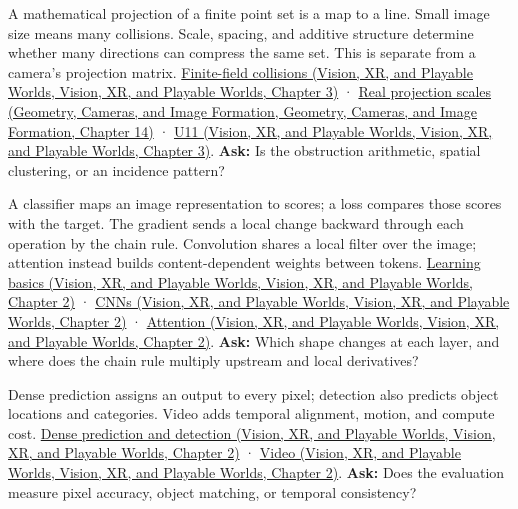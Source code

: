 A mathematical projection of a finite point set is a map to a line. Small image size means many collisions. Scale, spacing, and additive structure determine whether many directions can compress the same set. This is separate from a camera's projection matrix. \href{../07-Vision-XR-and-Playable-Worlds/main.pdf\#nameddest=04-visual-computing-ii-ch032-finite-field-projections-turn-image-size-into-collision-counts}{Finite-field collisions (Vision, XR, and Playable Worlds, Vision, XR, and Playable Worlds, Chapter 3)} · \href{../03-Geometry-Cameras-and-Image-Formation/main.pdf\#nameddest=04-visual-computing-ii-ch033-real-projections-add-scale-spacing-and-incidence-geometry}{Real projection scales (Geometry, Cameras, and Image Formation, Geometry, Cameras, and Image Formation, Chapter 14)} · \href{../07-Vision-XR-and-Playable-Worlds/main.pdf\#nameddest=04-visual-computing-ii-ch032-figure-u11---finite-grid-projections-expose-collision-counts}{U11 (Vision, XR, and Playable Worlds, Vision, XR, and Playable Worlds, Chapter 3)}. \textbf{Ask:} Is the obstruction arithmetic, spatial clustering, or an incidence pattern?

A classifier maps an image representation to scores; a loss compares those scores with the target. The gradient sends a local change backward through each operation by the chain rule. Convolution shares a local filter over the image; attention instead builds content-dependent weights between tokens. \href{../07-Vision-XR-and-Playable-Worlds/main.pdf\#nameddest=04-visual-computing-ii-ch031-learning-a-visual-classifier-from-examples}{Learning basics (Vision, XR, and Playable Worlds, Vision, XR, and Playable Worlds, Chapter 2)} · \href{../07-Vision-XR-and-Playable-Worlds/main.pdf\#nameddest=04-visual-computing-ii-ch031-convolutional-models-preserve-image-neighborhoods}{CNNs (Vision, XR, and Playable Worlds, Vision, XR, and Playable Worlds, Chapter 2)} · \href{../07-Vision-XR-and-Playable-Worlds/main.pdf\#nameddest=04-visual-computing-ii-ch031-sequence-models-and-attention}{Attention (Vision, XR, and Playable Worlds, Vision, XR, and Playable Worlds, Chapter 2)}. \textbf{Ask:} Which shape changes at each layer, and where does the chain rule multiply upstream and local derivatives?

Dense prediction assigns an output to every pixel; detection also predicts object locations and categories. Video adds temporal alignment, motion, and compute cost. \href{../07-Vision-XR-and-Playable-Worlds/main.pdf\#nameddest=04-visual-computing-ii-ch031-predict-pixels-and-localize-objects}{Dense prediction and detection (Vision, XR, and Playable Worlds, Vision, XR, and Playable Worlds, Chapter 2)} · \href{../07-Vision-XR-and-Playable-Worlds/main.pdf\#nameddest=04-visual-computing-ii-ch031-video-adds-motion-and-temporal-cost}{Video (Vision, XR, and Playable Worlds, Vision, XR, and Playable Worlds, Chapter 2)}. \textbf{Ask:} Does the evaluation measure pixel accuracy, object matching, or temporal consistency?

